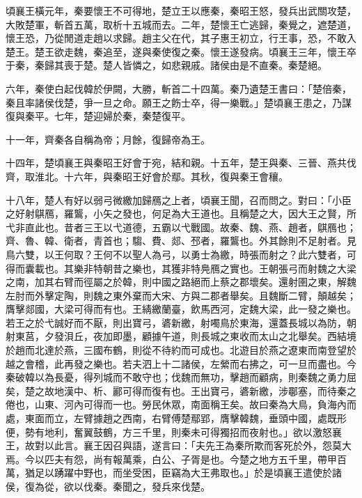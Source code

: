 \begin{pinyinscope}
頃襄王橫元年，秦要懷王不可得地，楚立王以應秦，秦昭王怒，發兵出武關攻楚，大敗楚軍，斬首五萬，取析十五城而去。二年，楚懷王亡逃歸，秦覺之，遮楚道，懷王恐，乃從閒道走趙以求歸。趙主父在代，其子惠王初立，行王事，恐，不敢入楚王。楚王欲走魏，秦追至，遂與秦使復之秦。懷王遂發病。頃襄王三年，懷王卒于秦，秦歸其喪于楚。楚人皆憐之，如悲親戚。諸侯由是不直秦。秦楚絕。

六年，秦使白起伐韓於伊闕，大勝，斬首二十四萬。秦乃遺楚王書曰：「楚倍秦，秦且率諸侯伐楚，爭一旦之命。願王之飭士卒，得一樂戰。」楚頃襄王患之，乃謀復與秦平。七年，楚迎婦於秦，秦楚復平。

十一年，齊秦各自稱為帝；月餘，復歸帝為王。

十四年，楚頃襄王與秦昭王好會于宛，結和親。十五年，楚王與秦、三晉、燕共伐齊，取淮北。十六年，與秦昭王好會於鄢。其秋，復與秦王會穰。

十八年，楚人有好以弱弓微繳加歸鴈之上者，頃襄王聞，召而問之。對曰：「小臣之好射鶀鴈，羅鸗，小矢之發也，何足為大王道也。且稱楚之大，因大王之賢，所弋非直此也。昔者三王以弋道德，五霸以弋戰國。故秦、魏、燕、趙者，鶀鴈也；齊、魯、韓、衛者，青首也；騶、費、郯、邳者，羅鸗也。外其餘則不足射者。見鳥六雙，以王何取？王何不以聖人為弓，以勇士為繳，時張而射之？此六雙者，可得而囊載也。其樂非特朝昔之樂也，其獲非特鳧鴈之實也。王朝張弓而射魏之大梁之南，加其右臂而徑屬之於韓，則中國之路絕而上蔡之郡壞矣。還射圉之東，解魏左肘而外擊定陶，則魏之東外棄而大宋、方與二郡者舉矣。且魏斷二臂，顛越矣；膺擊郯國，大梁可得而有也。王綪繳蘭臺，飲馬西河，定魏大梁，此一發之樂也。若王之於弋誠好而不厭，則出寶弓，碆新繳，射噣鳥於東海，還蓋長城以為防，朝射東莒，夕發浿丘，夜加即墨，顧據午道，則長城之東收而太山之北舉矣。西結境於趙而北達於燕，三國布鶴，則從不待約而可成也。北遊目於燕之遼東而南登望於越之會稽，此再發之樂也。若夫泗上十二諸侯，左縈而右拂之，可一旦而盡也。今秦破韓以為長憂，得列城而不敢守也；伐魏而無功，擊趙而顧病，則秦魏之勇力屈矣，楚之故地漢中、析、酈可得而復有也。王出寶弓，碆新繳，涉鄳塞，而待秦之倦也，山東、河內可得而一也。勞民休眾，南面稱王矣。故曰秦為大鳥，負海內而處，東面而立，左臂據趙之西南，右臂傅楚鄢郢，膺擊韓魏，垂頭中國，處既形便，勢有地利，奮翼鼓鶴，方三千里，則秦未可得獨招而夜射也。」欲以激怒襄王，故對以此言。襄王因召與語，遂言曰：「夫先王為秦所欺而客死於外，怨莫大焉。今以匹夫有怨，尚有報萬乘，白公、子胥是也。今楚之地方五千里，帶甲百萬，猶足以踴躍中野也，而坐受困，臣竊為大王弗取也。」於是頃襄王遣使於諸侯，復為從，欲以伐秦。秦聞之，發兵來伐楚。


\end{pinyinscope}
